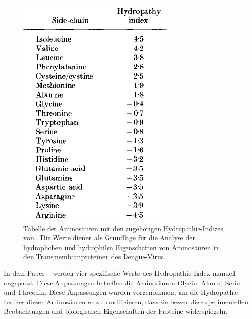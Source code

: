 \documentclass[german,version-2022-01]{uzl-thesis}
\begin{document}
\begin{figure}[tbp]
  \centering
  \includegraphics[scale=0.75]{Images/Hydropathy_scores_Paper.png}
  \caption{Tabelle der Aminos\"auren mit den zugeh\"origen Hydropathie-Indizes von \citeauthor{kyte_simple_1982} \cite{kyte_simple_1982}. Die Werte dienen als Grundlage f\"ur die Analyse der hydrophoben und hydrophilen Eigenschaften von Aminos\"auren in den Transmembranproteinen des Dengue-Virus.}
  \label{fig:Hydropathieindexe}
\end{figure}
In dem Paper ~\cite{kyte_simple_1982} werden vier spezifische Werte des Hydropathie-Index manuell angepasst. Diese Anpassungen betreffen die Aminos\"auren Glycin, Alanin, Serin und Threonin. Diese Anpassungen wurden vorgenommen, um die Hydropathie-Indizes dieser Aminos\"auren so zu modifizieren, dass sie besser die experimentellen Beobachtungen und biologischen Eigenschaften der Proteine widerspiegeln.
\end{document}
